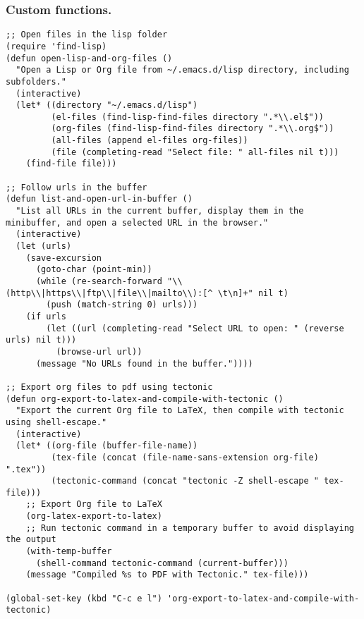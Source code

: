 \documentclass[11pt]{article}
\begin{document}
\subsubsection{Custom functions.}
\label{sec:orgc377f74}
\begin{verbatim}
;; Open files in the lisp folder
(require 'find-lisp)
(defun open-lisp-and-org-files ()
  "Open a Lisp or Org file from ~/.emacs.d/lisp directory, including subfolders."
  (interactive)
  (let* ((directory "~/.emacs.d/lisp")
         (el-files (find-lisp-find-files directory ".*\\.el$"))
         (org-files (find-lisp-find-files directory ".*\\.org$"))
         (all-files (append el-files org-files))
         (file (completing-read "Select file: " all-files nil t)))
    (find-file file)))

;; Follow urls in the buffer
(defun list-and-open-url-in-buffer ()
  "List all URLs in the current buffer, display them in the minibuffer, and open a selected URL in the browser."
  (interactive)
  (let (urls)
    (save-excursion
      (goto-char (point-min))
      (while (re-search-forward "\\(http\\|https\\|ftp\\|file\\|mailto\\):[^ \t\n]+" nil t)
        (push (match-string 0) urls)))
    (if urls
        (let ((url (completing-read "Select URL to open: " (reverse urls) nil t)))
          (browse-url url))
      (message "No URLs found in the buffer."))))

;; Export org files to pdf using tectonic
(defun org-export-to-latex-and-compile-with-tectonic ()
  "Export the current Org file to LaTeX, then compile with tectonic using shell-escape."
  (interactive)
  (let* ((org-file (buffer-file-name))
         (tex-file (concat (file-name-sans-extension org-file) ".tex"))
         (tectonic-command (concat "tectonic -Z shell-escape " tex-file)))
    ;; Export Org file to LaTeX
    (org-latex-export-to-latex)
    ;; Run tectonic command in a temporary buffer to avoid displaying the output
    (with-temp-buffer
      (shell-command tectonic-command (current-buffer)))
    (message "Compiled %s to PDF with Tectonic." tex-file)))

(global-set-key (kbd "C-c e l") 'org-export-to-latex-and-compile-with-tectonic)


\end{verbatim}
\end{document}
